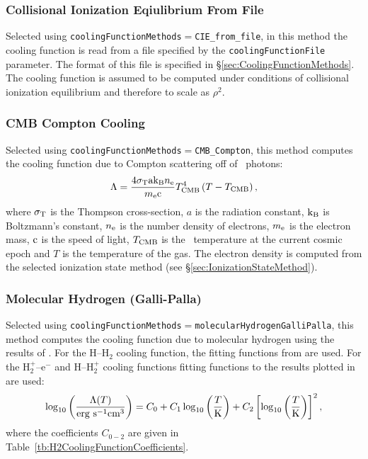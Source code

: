 \subsubsection{Collisional Ionization Eqiulibrium From File}

Selected using {\tt coolingFunctionMethods}$=${\tt CIE\_from\_file}, in this method the cooling function is read from a file specified by the {\tt coolingFunctionFile} parameter. The format of this file is specified in \S\ref{sec:CoolingFunctionMethods}. The cooling function is assumed to be computed under conditions of collisional ionization equilibrium and therefore to scale as $\rho^2$.

\subsubsection{CMB Compton Cooling}

Selected using {\tt coolingFunctionMethods}$=${\tt CMB\_Compton}, this method computes the cooling function due to Compton scattering off of \CMB\ photons:
\begin{equation}
\Lambda = {4 \sigma_{\rm T} {\rm a} {\rm k}_{\rm B} n_{\rm e } \over m_{\rm e} \clight} T_{\rm CMB}^4 \left( T - T_{\rm CMB} \right),
\end{equation}
where $\sigma_{\rm T}$ is the Thompson cross-section, $a$ is the radiation constant, ${\rm k}_{\rm B}$ is Boltzmann's constant, $n_{\rm e}$ is the number density of electrons, $m_{\rm e}$ is the electron mass, $\clight$ is the speed of light, $T_{\rm CMB}$ is the \CMB\ temperature at the current cosmic epoch and $T$ is the temperature of the gas. The electron density is computed from the selected ionization state method (see \S\ref{sec:IonizationStateMethod}).

\subsubsection{Molecular Hydrogen (Galli-Palla)}

Selected using {\tt coolingFunctionMethods}$=${\tt molecularHydrogenGalliPalla}, this method computes the cooling function due to molecular hydrogen using the results of \cite{galli_chemistry_1998}. For the H--H$_2$ cooling function, the fitting functions from \cite{galli_chemistry_1998} are used. For the H$_2^+$--e$^-$ and H--H$_2^+$ cooling functions fitting functions to the results plotted in  \cite{suchkov_cooling_1978} are used:
\begin{equation}
\log_{10}\left({\Lambda(T) \over \hbox{erg s}^{-1} \hbox{cm}^3}\right) = C_0 + C_1 \log_{10} \left({T\over\hbox{K}}\right) + C_2 \left[\log_{10} \left({T\over\hbox{K}}\right)\right]^2,
\label{eq:H2CoolingFunction}
\end{equation}
where the coefficients $C_{0-2}$ are given in Table~\ref{tb:H2CoolingFunctionCoefficients}.

